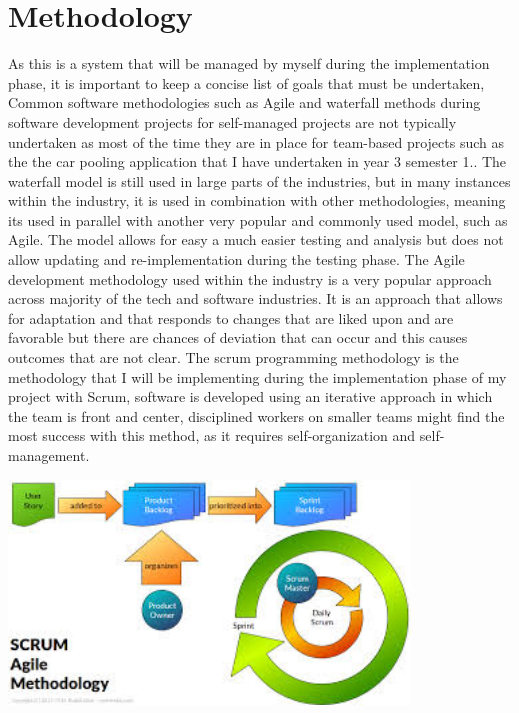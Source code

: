 \section{Methodology}
As this is a system that will be managed by myself during the implementation phase, it is important to keep a concise list of goals that must be undertaken,  Common software methodologies such as Agile and waterfall methods during software development projects  for self-managed  projects are not typically undertaken as most  of  the  time they are in place for  team-based projects such as the the car pooling application that I have undertaken in year 3 semester 1..  The waterfall model is still used in large parts of the industries, but in many instances within the industry, it is used in combination with other methodologies, meaning its used in parallel with another very popular and commonly used model, such as Agile.  The model allows for easy a much easier testing and analysis but does not allow updating and re-implementation during the testing phase. The Agile development methodology used within the industry is a very popular approach across majority of the tech and software industries.  It is an approach that allows for adaptation and that responds to changes that are liked upon and are favorable but there are chances of deviation that can occur and this causes outcomes that are not clear. The scrum programming methodology is the methodology that I will be implementing during the implementation phase of my project with Scrum, software is developed using an iterative approach in which the team is front and center, disciplined workers on smaller teams might find the most success with this method, as it requires self-organization and self-management.

\includegraphics[width=0.8\textwidth]{Figures/Methodologies.jpg}

